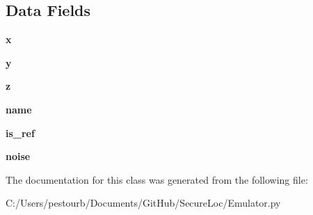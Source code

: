 \subsection*{Data Fields}
\begin{DoxyCompactItemize}
\item 
\mbox{\label{class_emulator_1_1_node_a9336ebf25087d91c818ee6e9ec29f8c1}} 
{\bfseries x}
\item 
\mbox{\label{class_emulator_1_1_node_a2fb1c5cf58867b5bbc9a1b145a86f3a0}} 
{\bfseries y}
\item 
\mbox{\label{class_emulator_1_1_node_a25ed1bcb423b0b7200f485fc5ff71c8e}} 
{\bfseries z}
\item 
\mbox{\label{class_emulator_1_1_node_ab74e6bf80237ddc4109968cedc58c151}} 
{\bfseries name}
\item 
\mbox{\label{class_emulator_1_1_node_af24398adc3c93eab7c7458dd6d628a8e}} 
{\bfseries is\+\_\+ref}
\item 
\mbox{\label{class_emulator_1_1_node_a5f275402fe7e3f672eab8b802e8913ca}} 
{\bfseries noise}
\end{DoxyCompactItemize}


The documentation for this class was generated from the following file\+:\begin{DoxyCompactItemize}
\item 
C\+:/\+Users/pestourb/\+Documents/\+Git\+Hub/\+Secure\+Loc/Emulator.\+py\end{DoxyCompactItemize}
